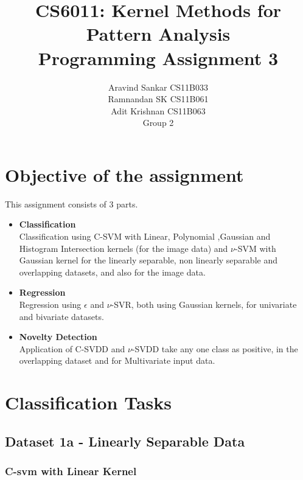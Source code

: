 \documentclass{article}
\begin{document}
\title{\textbf{CS6011: Kernel Methods for Pattern Analysis}
\\
\textbf{Programming Assignment 3}
}
\author{Aravind Sankar CS11B033 \\
Ramnandan SK CS11B061 \\
Adit Krishnan CS11B063 \\[0.2in]
Group 2
}
\maketitle
\tableofcontents 
\newpage
\section{Objective of the assignment}
This assignment consists of 3 parts. 
\begin{itemize}
\item \textbf{Classification} \\[5pt]
Classification using C-SVM with Linear, Polynomial ,Gaussian and Histogram Intersection kernels (for the image data) and $\nu$-SVM with Gaussian kernel for the linearly separable, non linearly separable and overlapping datasets, and also for the image data. \\[10pt]
\item \textbf{Regression} \\[5pt]
Regression using $\epsilon$ and $\nu$-SVR, both using Gaussian kernels, for univariate and bivariate datasets. \\[10pt]
\item \textbf{Novelty Detection}\\[5pt] 
Application of C-SVDD and $\nu$-SVDD take any one class as positive, in the overlapping dataset and for Multivariate input data. \\[10pt]
\end{itemize}


\section{Classification Tasks}





\subsection{Dataset 1a - Linearly Separable Data}



\subsubsection{C-svm with Linear Kernel}
\end{document}
